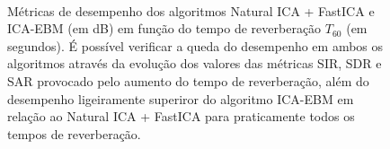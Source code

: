     \begin{figure}
        \centering
        \\
        \caption{Métricas de desempenho dos algoritmos Natural ICA + FastICA e ICA-EBM (em dB) em função do tempo de reverberação $T_{60}$ (em segundos). É possível verificar a queda do desempenho em ambos os algoritmos através da evolução dos valores das métricas SIR, SDR e SAR     provocado pelo aumento do tempo de reverberação, além do desempenho ligeiramente     superiror do algoritmo ICA-EBM em relação ao Natural ICA + FastICA para praticamente     todos os tempos de reverberação.}
        \label{fig:reverb_estimative}
    \end{figure}

